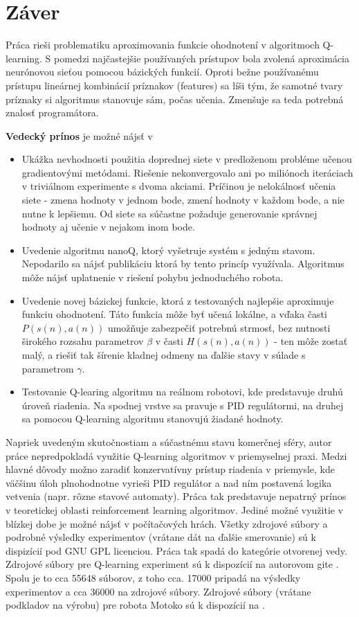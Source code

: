 \chapter{Záver}

Práca rieši problematiku aproximovania funkcie ohodnotení v algoritmoch Q-learning.
S pomedzi najčastejšie používaných prístupov bola zvolená aproximácia neurónovou
sieťou pomocou bázických funkcií. Oproti bežne používanému prístupu lineárnej kombinácií
príznakov (features) sa líši tým, že samotné tvary príznaky si algoritmus stanovuje sám,
počas učenia. Zmenšuje sa teda potrebná znalosť programátora.

{\bf Vedecký prínos} je možné nájsť v
\begin{itemize}
  \item Ukážka nevhodnosti použitia doprednej siete v predloženom probléme učenou
  gradientovými metódami. Riešenie nekonvergovalo ani po miliónoch iteráciach v triviálnom
  experimente s dvoma akciami. Príčinou je nelokálnosť učenia siete - zmena hodnoty v jednom bode,
  zmení hodnoty v každom bode, a nie nutne k lepšiemu. Od siete sa súčastne požaduje generovanie
  správnej hodnoty aj učenie v nejakom inom bode.
  \item Uvedenie algoritmu nanoQ, ktorý vyšetruje systém s jedným stavom. Nepodarilo sa nájsť
  publikáciu ktorá by tento princíp využívala. Algoritmus môže nájsť uplatnenie v riešení pohybu
  jednoduchého robota.
  \item Uvedenie novej bázickej funkcie, ktorá z testovaných najlepšie aproximuje funkciu ohodnotení.
  Táto funkcia môže byť učená lokálne, a vďaka časti $P(s(n), a(n))$ umožňuje zabezpečiť potrebnú
  strmosť, bez nutnosti širokého rozsahu parametrov $\beta$ v časti $H(s(n), a(n))$ - ten
  môže zostať malý, a riešiť tak šírenie kladnej odmeny na ďalšie stavy v súlade s parametrom
  $\gamma$.
  \item Testovanie Q-learing algoritmu na reálnom robotovi, kde predstavuje druhú úroveň
  riadenia. Na spodnej vrstve sa pravuje s PID regulátormi, na druhej sa pomocou Q-learning
  algoritmu stanovujú žiadané hodnoty.
\end{itemize}

Napriek uvedeným skutočnostiam a súčastnému stavu komerčnej sféry, autor práce nepredpokladá
využitie Q-learning algoritmov v priemyselnej praxi. Medzi hlavné dôvody možno zaradiť
konzervatívny prístup riadenia v priemysle, kde väčšinu úloh plnohodnotne vyrieši PID
regulátor a nad ním postavená logika vetvenia (napr. rôzne stavové automaty).
Práca tak predstavuje nepatrný prínos v teoretickej oblasti reinforcement learning algoritmov.
Jediné možné využitie v blízkej dobe je možné nájsť v počítačových hrách.
Všetky zdrojové súbory a podrobné výsledky experimentov (vrátane dát na ďalšie smerovanie)
sú k dispizícií pod GNU GPL licenciou. Práca tak spadá do kategórie otvorenej vedy.
Zdrojové súbory pre Q-learning experiment sú k dispozícií na autorovom gite \cite{bib:q_learning_git}.
Spolu je to cca 55648 súborov, z toho cca. 17000 pripadá na výsledky experimentov a cca 36000 na
 zdrojové súbory. Zdrojové súbory (vrátane podkladov na výrobu) pre robota Motoko sú k dispozícií na
 \cite{bib:motoko_git}.

